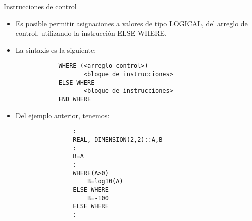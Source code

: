 \begin{frame}[fragile]{Instrucciones de control} 
    \begin{itemize}[<+(0)->]
        \item Es posible permitir asignaciones a valores de tipo LOGICAL, del arreglo de control, utilizando la instrucción ELSE WHERE.
        \item La sintaxis es la siguiente: \\
            \begin{verbatim}
            WHERE (<arreglo control>)
                   <bloque de instrucciones> 
            ELSE WHERE 
                   <bloque de instrucciones>
            END WHERE
            \end{verbatim}
        \item [] Del ejemplo anterior, tenemos:
            \begin{verbatim}
                :
                REAL, DIMENSION(2,2)::A,B
                :
                B=A
                :
                WHERE(A>0) 
                    B=log10(A)
                ELSE WHERE
                    B=-100
                ELSE WHERE
                :
            \end{verbatim} 
    \end{itemize}
\end{frame}


